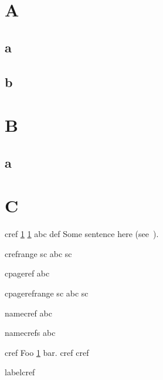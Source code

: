 \documentclass[11pt]{article}
\begin{document}
\section{A}
\label{sa}

\subsection{a}
\label{ssaa}

\subsection{b}
\label{ssab}

\section{B}
\label{sb}

\subsection{a}
\label{ssba}

\section{C}
\label{sc}

cref
\cref{sa}
    \cref{sa}
abc def 
Some sentence here (see~).

crefrange
 {sc}
abc  {sc}

cpageref
abc 

cpagerefrange
 {sc}
abc  {sc}

namecref
abc 

namecrefs
abc 

cref
Foo \cref{sa} bar.
cref %
cref %

labelcref
\end{document}
